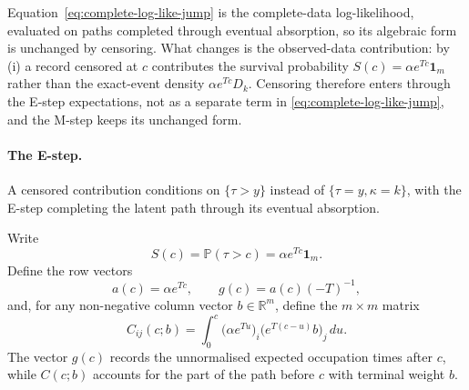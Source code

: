 \documentclass{article}
\newcommand{\Prob}{\mathbb{P}}
\newenvironment{aarevision}{}{}
\begin{document}
\begin{aarevision}
Equation~\eqref{eq:complete-log-like-jump} is the complete-data log-likelihood, evaluated on paths completed through eventual absorption, so its algebraic form is unchanged by censoring. What changes is the observed-data contribution: by (i) a record censored at $c$ contributes the survival probability $S(c)=\alpha e^{Tc}\mathbf 1_m$ rather than the exact-event density $\alpha e^{Tc}D_k$. Censoring therefore enters through the E-step expectations, not as a separate term in \eqref{eq:complete-log-like-jump}, and the M-step keeps its unchanged form.
\end{aarevision}

\begin{aarevision}
\paragraph{The E-step.} A censored contribution conditions on $\{\tau>y\}$ instead of $\{\tau=y,\kappa=k\}$, with the E-step completing the latent path through its eventual absorption. \end{aarevision}

Write
\begin{equation}
\label{eq:censored-definitions}
S(c)=\Prob(\tau>c)=\alpha e^{Tc}\mathbf 1_m .
\end{equation}
Define the row vectors
\begin{equation}
\label{eq:censored-ag}
a(c)=\alpha e^{Tc},
\qquad
g(c)=a(c)(-T)^{-1},
\end{equation}
and, for any non-negative column vector $b\in\mathbb R^m$, define the $m\times m$ matrix
\begin{equation}
\label{eq:censored-Cb}
C_{ij}(c;b)=\int_0^c
       \big(\alpha e^{Tu}\big)_i
       \big(e^{T(c-u)}b\big)_j\,du.
\end{equation}
The vector $g(c)$ records the unnormalised expected occupation times after $c$, while $C(c;b)$ accounts for the part of the path before $c$ with terminal weight $b$.
\end{document}
